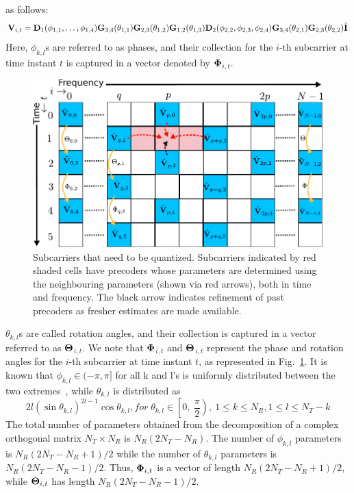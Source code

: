 \documentclass[11pt,a4paper]{report}
\def\bD{{\bf D}}
\def\bG{{\bf G}}
\def\bI{{\bf I}}
\def\bV{{\bf V}}
\begin{document}
as follows:
\begin{equation}
  \bV_{i,t}  =
  \bD_{1}(\phi_{1,1},\ldots,\phi_{1,4})\bG_{3,4}(\theta_{1,1})
  \bG_{2,3}(\theta_{1,2}) \bG_{1,2}(\theta_{1,3})
  \bD_{2}(\phi_{2,2},\phi_{2,3},\phi_{2,4}) \bG_{3,4}(\theta_{2,1}) \bG_{2,3}(\theta_{2,2})\tilde{\bI}
\end{equation}
Here, $\phi_{k,l}$s are referred to as phases, and their collection
for the $i$-th subcarrier at time instant $t$ is captured in a vector
denoted by $\bf{\Phi}$$_{i,t}$.
\begin{figure}
\begin{center}
\includegraphics[width=0.7\columnwidth]{images/new-adpm2.pdf}
\caption{\label{fig:adpm-fig}Subcarriers that need to be
  quantized. Subcarriers indicated by red shaded cells have precoders 
  whose parameters are determined using the neighbouring parameters
  (shown via red arrows), both in time and frequency. The black arrow 
  indicates refinement of past precoders as fresher estimates are made
  available.}
\end{center}
\end{figure}
$\theta_{k,l}$s are called rotation angles, and their collection is
captured in a vector referred to as $\bf{\Theta}$$_{i,t}$. We note that
$\bf{\Phi}$$_{i,t}$ and $\bf{\Theta}$$_{i,t}$ represent the phase and
rotation angles for the $i$-th subcarrier at time instant $t$, as
represented in Fig.~\ref{fig:adpm-fig}. It is known
that $\phi_{k,l} \in (-\pi, \pi]$ for all k and l's is uniformly
distributed between the two extremes~\cite{4114278}, while
$\theta_{k,l}$ is distributed as
\begin{equation}
2l(\sin\theta_{k,l})^{2l-1}\cos\theta_{k,l}, for \;
\theta_{k,l} \in \left[0,\: \frac{\pi}{2}\right),\: 1\leq k \leq N_R,
1\leq l \leq N_T -k
\end{equation}
The total number of parameters obtained from the
decomposition of a complex orthogonal matrix $N_{T} \times N_{R} $ is
$N_{R}(2N_{T} - N_{R})$. The number of $\phi_{k,l}$ parameters is
$N_{R}(2N_{T} - N_{R}+1)/2$ while the number of $\theta_{k,l}$
parameters is $N_{R}(2N_{T} - N_{R}-1)/2$. Thus, ${\bf{\Phi}}_{i,t}$
is a vector of length $N_{R}(2N_{T} - N_{R}+1)/2$, while
${\bf{\Theta}}_{i,t}$ has length
$N_{R}(2N_{T} - N_{R}-1)/2$.~\cite{4114278}
\end{document}
